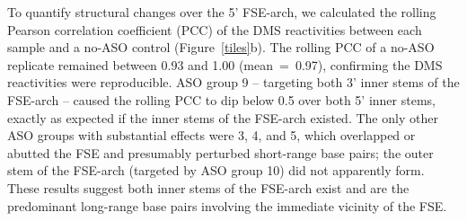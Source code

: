 \documentclass[main.tex]{subfiles}
\begin{document}
To quantify structural changes over the 5' FSE-arch, we calculated the rolling Pearson correlation coefficient (PCC) of the DMS reactivities between each sample and a no-ASO control (Figure~\ref{tiles}b).
The rolling PCC of a no-ASO replicate remained between 0.93 and 1.00 (mean~=~0.97), confirming the DMS reactivities were reproducible.
ASO group 9 -- targeting both 3' inner stems of the FSE-arch -- caused the rolling PCC to dip below 0.5 over both 5' inner stems, exactly as expected if the inner stems of the FSE-arch existed.
The only other ASO groups with substantial effects were 3, 4, and 5, which overlapped or abutted the FSE and presumably perturbed short-range base pairs; the outer stem of the FSE-arch (targeted by ASO group 10) did not apparently form.
These results suggest both inner stems of the FSE-arch exist and are the predominant long-range base pairs involving the immediate vicinity of the FSE.
\end{document}
